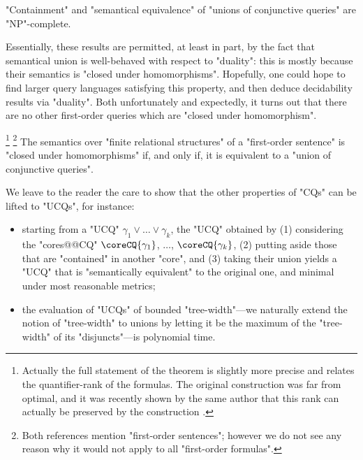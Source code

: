 \begin{corollary}
	"Containment" and "semantical equivalence" of "unions of conjunctive queries"
	are "NP"-complete.
\end{corollary}

Essentially, these results are permitted, at least in part, by the fact that semantical union
is well-behaved with respect to "duality": this is mostly because their semantics 
is "closed under homomorphisms". Hopefully, one could hope to find larger
query languages satisfying this property, and then deduce decidability results via "duality".
Both unfortunately and expectedly, it turns out that there
are no other first-order queries which are "closed under homomorphism".
\begin{proposition}
	\!\footnote{Actually the full statement of the theorem is
	slightly more precise and relates the quantifier-rank of the formulas.
	The original construction was far from optimal, and it was
	recently shown by the same author
	that this rank can actually be preserved by the construction
	\cite[Theorem~1.4]{Rossman2025Equirank}.}
	\footnote{Both references mention "first-order sentences"; however we do not see
	any reason why it would not apply to all "first-order formulas".}
	The semantics over "finite relational structures"
	of a "first-order sentence" is "closed under homomorphisms"
	if, and only if, it is equivalent to a "union of conjunctive queries".
\end{proposition}

We leave to the reader the care to show that the other properties of "CQs"
can be lifted to "UCQs", for instance:
\begin{itemize}
	\item starting from a "UCQ" $\gamma_1 \lor \dotsc \lor \gamma_k$,
		the "UCQ" obtained by (1) considering the "cores@@CQ"
		$\coreCQ{\gamma_1}$, $\dotsc$, $\coreCQ{\gamma_k}$,
		(2) putting aside those that are "contained" in another "core",
		and (3) taking their union
		yields a "UCQ" that is "semantically equivalent" to the
		original one, and minimal under most reasonable metrics;
	\item the evaluation of "UCQs" of bounded "tree-width"---we naturally
		extend the notion of "tree-width" to unions by letting it
		be the maximum of the "tree-width" of its "disjuncts"---is
		polynomial time. 
\end{itemize}